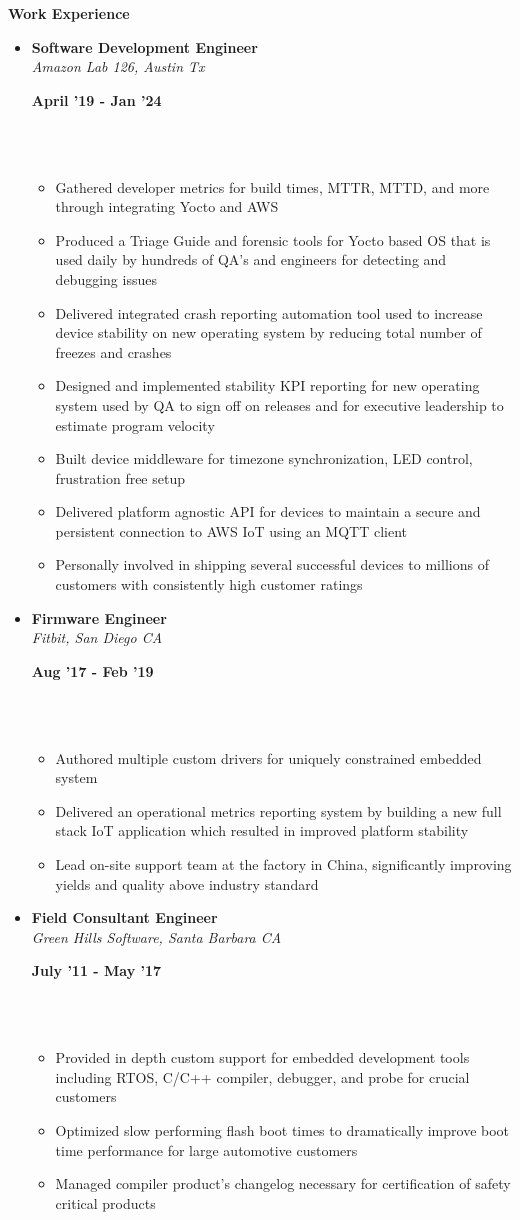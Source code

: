 \documentclass[a4paper,11pt]{article}
\newcommand{\isep}{0 pt}
\newcommand{\resheading}[1]{{\small \colorbox{mygrey}{\begin{minipage}{0.975\textwidth}{\textbf{#1 \vphantom{p\^{E}}}}\end{minipage}}}}
\newcommand{\workexp}[4]{
\begin{minipage}[t]{7cm}
\begin{flushleft}
\textbf{#1} \\
\indent \emph{#2}\\
\end{flushleft}
\end{minipage}
\hfill
\begin{minipage}[t]{7cm}
\begin{flushright}
\textbf{#3} \\
\indent #4 \\
\end{flushright}
\end{minipage}
\\[-0.10in]
}
\begin{document}
\resheading{\textbf{Work Experience}}
\begin{itemize}
\item
\workexp{Software Development Engineer}{Amazon Lab 126, Austin Tx}{April '19 - Jan '24}{}
    \begin{itemize}\itemsep \isep
    	\item Gathered developer metrics for build times, MTTR, MTTD, and more through integrating Yocto and AWS
    	\item Produced a Triage Guide and forensic tools for Yocto based OS that is used daily by hundreds of QA's and engineers for detecting and debugging issues
    	\item Delivered integrated crash reporting automation tool used to increase device stability on new operating system by reducing total number of freezes and crashes
    	\item Designed and implemented stability KPI reporting for new operating system used by QA to sign off on releases and for executive leadership to estimate program velocity
    	\item Built device middleware for timezone synchronization, LED control, frustration free setup
        \item Delivered platform agnostic API for devices to maintain a secure and persistent connection to AWS IoT using an MQTT client
        \item Personally involved in shipping several successful devices to millions of customers with consistently high customer ratings
    \end{itemize}

\item
\workexp{Firmware Engineer}{Fitbit, San Diego CA}{Aug '17 - Feb '19}{}
    \begin{itemize}\itemsep \isep
        \item Authored multiple custom drivers for uniquely constrained embedded system
        \item Delivered an operational metrics reporting system by building a new full stack IoT application which resulted in improved platform stability
        \item Lead on-site support team at the factory in China, significantly improving yields and quality above industry standard
    \end{itemize}

\item
\workexp{Field Consultant Engineer}{Green Hills Software, Santa Barbara CA}{July '11 - May '17}{}
	\begin{itemize}\itemsep \isep
        \item Provided in depth custom support for embedded development tools including RTOS, C/C++ compiler, debugger, and probe for crucial customers
        \item Optimized slow performing flash boot times to dramatically improve boot time performance for large automotive customers
        \item Managed compiler product's changelog necessary for certification of safety critical products
	\end{itemize}


\end{itemize}
\end{document}
